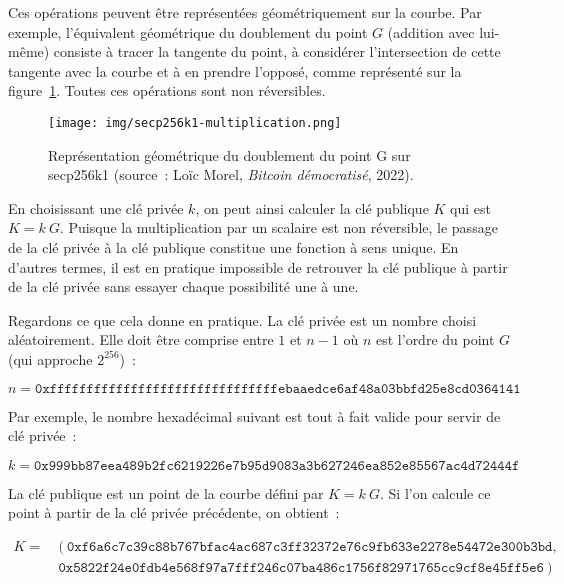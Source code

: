 Ces opérations peuvent être représentées géométriquement sur la courbe. Par exemple, l'équivalent géométrique du doublement du point $G$ (addition avec lui-même) consiste à tracer la tangente du point, à considérer l'intersection de cette tangente avec la courbe et à en prendre l'opposé, comme représenté sur la figure~\ref{fig:secp256k1-multiplication}. Toutes ces opérations sont non réversibles.

\begin{figure}[h]
  \centering
  \texttt{[image: img/secp256k1-multiplication.png]}
  \caption{Représentation géométrique du doublement du point G sur secp256k1 (source~: Loïc Morel, \emph{Bitcoin démocratisé}, 2022).}
  \label{fig:secp256k1-multiplication}
\end{figure}

En choisissant une clé privée $k$, on peut ainsi calculer la clé publique $K$ qui est $K = k~G$. Puisque la multiplication par un scalaire est non réversible, le passage de la clé privée à la clé publique constitue une fonction à sens unique. En d'autres termes, il est en pratique impossible de retrouver la clé publique à partir de la clé privée sans essayer chaque possibilité une à une.


Regardons ce que cela donne en pratique. La clé privée est un nombre choisi aléatoirement. Elle doit être comprise entre $1$ et $n - 1$ où $n$ est l'ordre du point $G$ (qui approche $2^{256}$)~: 

{ \scriptsize
\[
n = \mathtt{0xfffffffffffffffffffffffffffffffebaaedce6af48a03bbfd25e8cd0364141}
\]
}

Par exemple, le nombre hexadécimal suivant est tout à fait valide pour servir de clé privée~:

{ \scriptsize
\[
k = \mathtt{0x999bb87eea489b2fc6219226e7b95d9083a3b627246ea852e85567ac4d72444f}
\]
}


La clé publique est un point de la courbe défini par $K = k~G$. Si l'on calcule ce point à partir de la clé privée précédente, on obtient~:

{ \scriptsize
\begin{align*}
K = &~(~\mathtt{0xf6a6c7c39c88b767bfac4ac687c3ff32372e76c9fb633e2278e54472e300b3bd}, \\
    &~\mathtt{0x5822f24e0fdb4e568f97a7fff246c07ba486c1756f82971765cc9cf8e45ff5e6}~)
\end{align*}
}

